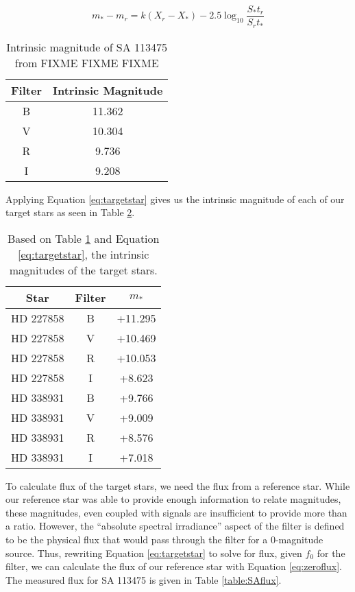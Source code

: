 \documentclass{article}
\begin{document}
\begin{equation}
\label{eq:targetstar}
m_*-m_r=k(X_r-X_*)-2.5\log_{10}\frac{S_*t_r}{S_rt_*}
\end{equation}

\begin{table}
\begin{center}
\begin{tabular}{c | c}
Filter & Intrinsic Magnitude \\
\hline
B & 11.362 \\
V &  10.304\\
R & 9.736\\
I & 9.208
\end{tabular}
\end{center}
\caption{Intrinsic magnitude of SA 113475 from \huge FIXME FIXME FIXME}
\label{table:SAmag}
\end{table}

Applying Equation \ref{eq:targetstar} gives us the intrinsic magnitude of each of our target stars as seen in Table \ref{table:relmag}.

\begin{table}
\begin{center}
\begin{tabular}{c | c | c }
Star & Filter & $m_*$\\
\hline
HD 227858 & B & +11.295\\
HD 227858 & V & +10.469 \\
HD 227858 & R & +10.053 \\
HD 227858 & I &   +8.623 \\
HD 338931 & B & +9.766 \\
HD 338931 & V & +9.009\\
HD 338931 & R &  +8.576\\
HD 338931 & I & +7.018
\end{tabular}
\end{center}
\caption{Based on Table \ref{table:SAmag} and Equation \ref{eq:targetstar}, the intrinsic magnitudes of the target stars.}
\label{table:relmag}
\end{table}

To calculate flux of the target stars, we need the flux from a reference star. While our reference star was able to provide enough information to relate magnitudes,
these magnitudes, even coupled with signals are insufficient to provide more than a ratio. However, the ``absolute spectral irradiance''
aspect of the filter is defined to be the physical flux that would pass through the filter for a 0-magnitude source. Thus, rewriting Equation
\ref{eq:targetstar} to solve for flux, given $f_0$ for the filter, we can calculate the flux of our reference star with Equation \ref{eq:zeroflux}. 
The measured flux for SA 113475 is given in Table \ref{table:SAflux}.
\end{document}

